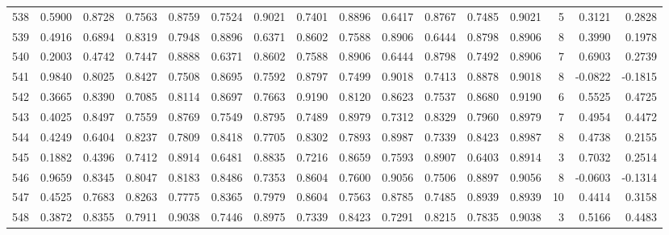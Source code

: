 \begin{tabular}{lrrrrrrrrrrrrrrr}
538 &      0.5900 &  0.8728 &  0.7563 &  0.8759 &  0.7524 &  0.9021 &  0.7401 &  0.8896 &  0.6417 &  0.8767 &   0.7485 &     0.9021 &      5 &                    0.3121 &                     0.2828 \\
539 &      0.4916 &  0.6894 &  0.8319 &  0.7948 &  0.8896 &  0.6371 &  0.8602 &  0.7588 &  0.8906 &  0.6444 &   0.8798 &     0.8906 &      8 &                    0.3990 &                     0.1978 \\
540 &      0.2003 &  0.4742 &  0.7447 &  0.8888 &  0.6371 &  0.8602 &  0.7588 &  0.8906 &  0.6444 &  0.8798 &   0.7492 &     0.8906 &      7 &                    0.6903 &                     0.2739 \\
541 &      0.9840 &  0.8025 &  0.8427 &  0.7508 &  0.8695 &  0.7592 &  0.8797 &  0.7499 &  0.9018 &  0.7413 &   0.8878 &     0.9018 &      8 &                   -0.0822 &                    -0.1815 \\
542 &      0.3665 &  0.8390 &  0.7085 &  0.8114 &  0.8697 &  0.7663 &  0.9190 &  0.8120 &  0.8623 &  0.7537 &   0.8680 &     0.9190 &      6 &                    0.5525 &                     0.4725 \\
543 &      0.4025 &  0.8497 &  0.7559 &  0.8769 &  0.7549 &  0.8795 &  0.7489 &  0.8979 &  0.7312 &  0.8329 &   0.7960 &     0.8979 &      7 &                    0.4954 &                     0.4472 \\
544 &      0.4249 &  0.6404 &  0.8237 &  0.7809 &  0.8418 &  0.7705 &  0.8302 &  0.7893 &  0.8987 &  0.7339 &   0.8423 &     0.8987 &      8 &                    0.4738 &                     0.2155 \\
545 &      0.1882 &  0.4396 &  0.7412 &  0.8914 &  0.6481 &  0.8835 &  0.7216 &  0.8659 &  0.7593 &  0.8907 &   0.6403 &     0.8914 &      3 &                    0.7032 &                     0.2514 \\
546 &      0.9659 &  0.8345 &  0.8047 &  0.8183 &  0.8486 &  0.7353 &  0.8604 &  0.7600 &  0.9056 &  0.7506 &   0.8897 &     0.9056 &      8 &                   -0.0603 &                    -0.1314 \\
547 &      0.4525 &  0.7683 &  0.8263 &  0.7775 &  0.8365 &  0.7979 &  0.8604 &  0.7563 &  0.8785 &  0.7485 &   0.8939 &     0.8939 &     10 &                    0.4414 &                     0.3158 \\
548 &      0.3872 &  0.8355 &  0.7911 &  0.9038 &  0.7446 &  0.8975 &  0.7339 &  0.8423 &  0.7291 &  0.8215 &   0.7835 &     0.9038 &      3 &                    0.5166 &                     0.4483 \\

\end{tabular}
